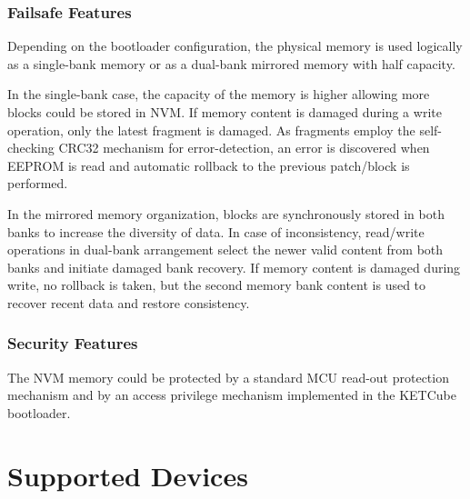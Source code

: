  
\subsubsection{Failsafe Features}\label{sec:arch:EEPROMMap:failsafe} 
 
 Depending on the bootloader configuration, the physical memory is used logically as a single-bank memory or as a dual-bank mirrored memory with half capacity. 

 In the single-bank case, the capacity of the memory is higher allowing more blocks could be stored in NVM. 
 If memory content is damaged during a write operation, only the latest fragment is damaged. 
 As fragments employ the self-checking CRC32 mechanism for error-detection, an error is discovered when EEPROM is read and automatic rollback to the previous patch/block is performed.

 
 In the mirrored memory organization, blocks are synchronously stored in both banks to increase the diversity of data. 
 In case of inconsistency, read/write operations in dual-bank arrangement select the newer valid content from both banks and initiate damaged bank recovery.
 If memory content is damaged during write, no rollback is taken, but the second memory bank content is used to recover recent data and restore consistency.
 
 
\subsubsection{Security Features}\label{sec:arch:EEPROMMap:sec}

The NVM memory could be protected by a standard MCU read-out protection mechanism and by an access privilege mechanism implemented in the KETCube bootloader.


\clearpage
\section{Supported Devices}\label{sec:supportedDevices}


